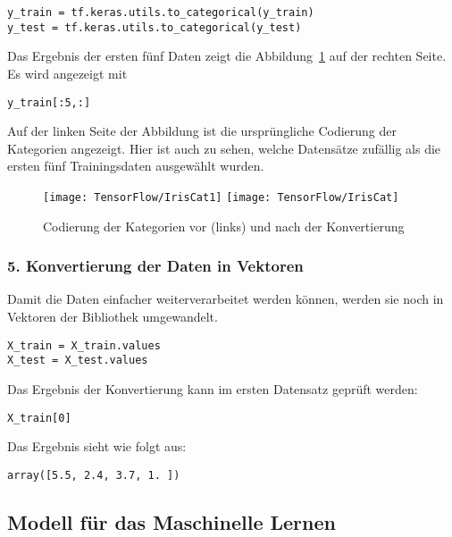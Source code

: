 \begin{verbatim}
y_train = tf.keras.utils.to_categorical(y_train)
y_test = tf.keras.utils.to_categorical(y_test)
\end{verbatim}

\bigskip

Das Ergebnis der ersten fünf Daten zeigt die Abbildung~\ref{TensorFlowIrisCat} auf der rechten Seite. Es wird angezeigt mit

\begin{verbatim}
y_train[:5,:]
\end{verbatim}

Auf der linken Seite der Abbildung ist die ursprüngliche Codierung der Kategorien angezeigt. Hier ist auch zu sehen, welche Datensätze zufällig als die ersten fünf
Trainingsdaten ausgewählt wurden.

\begin{figure}[H]
	\begin{center}
		\texttt{[image: TensorFlow/IrisCat1]}
		\texttt{[image: TensorFlow/IrisCat]}
		\caption{Codierung der Kategorien vor (links) und nach der Konvertierung} 
		\label{TensorFlowIrisCat}
	\end{center}
\end{figure}



\subsubsection{5. Konvertierung der Daten in Vektoren}

Damit die Daten einfacher weiterverarbeitet werden können, werden sie noch in Vektoren der 
Bibliothek  umgewandelt.

\begin{verbatim}
X_train = X_train.values
X_test = X_test.values
\end{verbatim}

Das Ergebnis der Konvertierung kann im ersten Datensatz geprüft werden:

\begin{verbatim}
X_train[0]
\end{verbatim}

Das Ergebnis sieht wie folgt aus:

\begin{lstlisting}[numbers=none]
array([5.5, 2.4, 3.7, 1. ])
\end{lstlisting}


\subsection{Modell für das Maschinelle Lernen}


